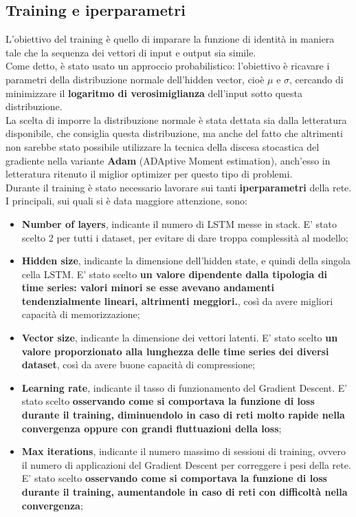 \subsection{Training e iperparametri}
L'obiettivo del training è quello di imparare la funzione di identità in maniera tale che la sequenza dei vettori di input e output sia simile.\\ 
Come detto, è stato usato un approccio probabilistico: l'obiettivo è ricavare i parametri della distribuzione normale dell'hidden vector, cioè $\mu$ e $\sigma$, cercando di minimizzare il \textbf{logaritmo di verosimiglianza} dell'input sotto questa distribuzione.\\
La scelta di imporre la distribuzione normale è stata dettata sia dalla letteratura disponibile, che consiglia questa distribuzione, ma anche del fatto che altrimenti non sarebbe stato possibile utilizzare la tecnica della discesa stocastica del gradiente nella variante \textbf{Adam} (ADAptive Moment estimation), anch'esso in letteratura ritenuto il miglior optimizer per questo tipo di problemi.
\\
Durante il training è stato necessario lavorare sui tanti \textbf{iperparametri} della rete. I principali, sui quali si è data maggiore attenzione, sono:
\begin{itemize}
	\item \textbf{Number of layers}, indicante il numero di LSTM messe in stack. E' stato scelto 2 per tutti i dataset, per evitare di dare troppa complessità al modello;
	
	\item \textbf{Hidden size}, indicante la dimensione dell'hidden state, e quindi della singola cella LSTM. E' stato scelto \textbf{un valore dipendente dalla tipologia di time series: valori minori se esse avevano andamenti tendenzialmente lineari, altrimenti meggiori.}, così da avere migliori capacità di memorizzazione;
	
	\item \textbf{Vector size}, indicante la dimensione dei vettori latenti. E' stato scelto \textbf{un valore proporzionato alla lunghezza delle time series dei diversi dataset}, così da avere buone capacità di compressione;
	
	\item \textbf{Learning rate}, indicante il tasso di funzionamento del Gradient Descent. E' stato scelto \textbf{osservando come si comportava la funzione di loss durante il training, diminuendolo in caso di reti molto rapide nella convergenza oppure con grandi fluttuazioni della loss};
	
	\item \textbf{Max iterations}, indicante il numero massimo di sessioni di training, ovvero il numero di applicazioni del Gradient Descent per correggere i pesi della rete. E' stato scelto \textbf{osservando come si comportava la funzione di loss durante il training, aumentandole in caso di reti con difficoltà nella convergenza};
	
\end{itemize}
